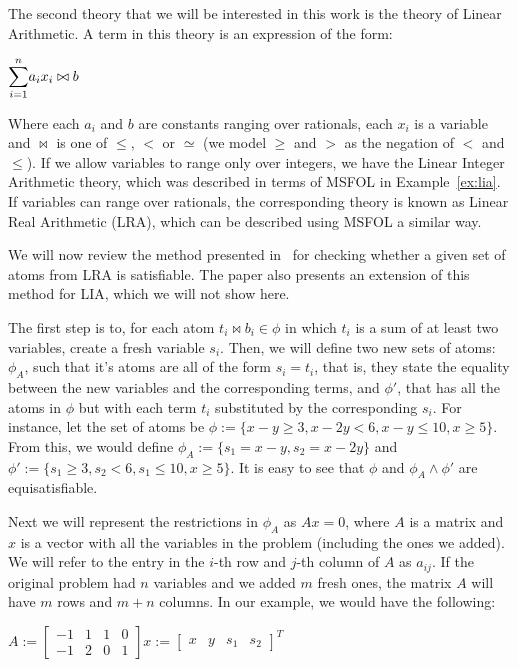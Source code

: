 The second theory that we will be interested in this work is the theory of Linear Arithmetic. A term in this theory is an expression of the form:
\begin{center}
  $\mathlarger{\sum}_{i = 1}^{n} a_{i} x_{i} \bowtie b$
\end{center}

Where each $a_{i}$ and $b$ are constants ranging over rationals, each $x_{i}$ is a variable and $\bowtie$ is one of $\le$, $<$ or $\simeq$ (we model $\ge$ and $>$ as the negation of $<$ and $\le$). If we allow variables to range only over integers, we have the Linear Integer Arithmetic theory, which was described in terms of MSFOL in Example~\ref{ex:lia}. If variables can range over rationals, the corresponding theory is known as Linear Real Arithmetic (LRA), which can be described using MSFOL a similar way.

We will now review the method presented in~\cite{simplex_dpllt} for checking whether a given set of atoms from LRA is satisfiable. The paper also presents an extension of this method for LIA, which we will not show here.

The first step is to, for each atom $t_{i} \bowtie b_{i} \in \phi$ in which $t_{i}$ is a sum of at least two variables, create a fresh variable $s_{i}$. Then, we will define two new sets of atoms: $\phi_{A}$, such that it's atoms are all of the form $s_{i} = t_{i}$, that is, they state the equality between the new variables and the corresponding terms, and $\phi'$, that has all the atoms in $\phi$ but with each term $t_{i}$ substituted by the corresponding $s_{i}$. For instance, let the set of atoms be
$\phi := \{x - y \ge 3, x - 2y < 6, x - y \le 10, x \ge 5\}$.  From this, we would define $\phi_{A} := \{s_{1} = x - y, s_{2} = x - 2y\}$ and $\phi' := \{s_{1} \ge 3, s_{2} < 6, s_{1} \le 10, x \ge 5\}$. It is easy to see that $\phi$ and $\phi_{A} \wedge \phi'$ are equisatisfiable.

Next we will represent the restrictions in $\phi_{A}$ as $Ax = 0$, where $A$ is a matrix and $x$ is a vector with all the variables in the problem (including the ones we added). We will refer to the entry in the $i$-th row and $j$-th column of $A$ as $a_{ij}$. If the original problem had $n$ variables and we added $m$ fresh ones, the matrix $A$ will have $m$ rows and $m + n$ columns. In our example, we would have the following:

\begin{center}
$
A :=
\begin{bmatrix}
  -1 & 1 & 1 & 0 \\
  -1 & 2 & 0 & 1
\end{bmatrix}
x :=
\begin{bmatrix}
  x & y & s_{1} & s_{2}
\end{bmatrix}^{T}
$
\end{center}

